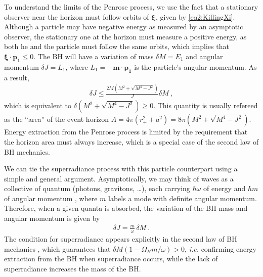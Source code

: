 To understand the limits of the Penrose process, we use the fact that a stationary observer near the horizon must follow orbits of $\bm{\xi}$, given by \eqref{eq2:KillingXi}. 
Although a particle may have negative energy as measured by an asymptotic observer, the stationary one at the horizon must measure a positive energy, as both he and the particle must follow the same orbits, which implies that $\bm{\xi} \cdot  \bm{p_1} \le 0$.
The BH will have a variation of mass $\delta M =E_1$ and angular momentum $\delta J = L_1$, where $L_1 = - \bm{m} \cdot \bm{p_1}$ is the particle's angular momentum. As a result,
\begin{align}
    \label{eq2:penroseCondition}
    \delta J \le \frac{2M\left(M^2+\sqrt{M^4-J^2}\right)}{J} \delta M ~,
\end{align}
which is equivalent to $\delta \left(M^2+\sqrt{M^4-J^2}\right) \ge 0$. This quantity is usually refereed as the ``area'' of the event horizon $A=4\pi(r_+^2+a^2)=8\pi\left(M^2+\sqrt{M^4-J^2}\right)$.
Energy extraction from the Penrose process is limited by the requirement that the horizon area must always increase, which is a special case of the second law of BH mechanics. 

We can tie the superradiance process with this particle counterpart using a simple and general argument.
Asymptotically, we may think of waves as a collective of quantum (photons, gravitons, \dots), each carrying $\hbar \omega$ of energy and $\hbar m$ of angular momentum \cite{Bekenstein1973}, where $m$ labels a mode with definite angular momentum.
Therefore, when a given quanta is absorbed, the variation of the BH mass and angular momentum is given by
\begin{align}
    \label{eq2:spinMassRatio}
    \delta J = \frac{m}{\omega} \,\delta M ~.
\end{align}
The condition for superradiance  appears explicitly in the second law of BH mechanics , which guarantees that $\delta M (1 - \Omega_H m /\omega)>0$, \emph{i.e.} confirming energy extraction from the BH when superradiance occurs, while the lack of superradiance increases the mass of the BH.


\cleardoublepage